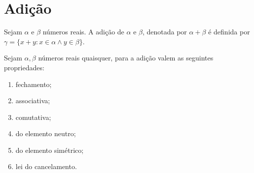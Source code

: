 \documentclass[../main.tex]{subfiles}
\begin{document}
\section{Adição}
\begin{defi}
    Sejam $\alpha$ e $\beta$ números reais. A adição de $\alpha$ e $\beta$, denotada por $\alpha + \beta$ é definida por $\gamma = \{ x + y : x \in \alpha \land y \in \beta \}$.
\end{defi}
\begin{prop}\label{reais-prop-prop}{Sejam $\alpha, \beta$ números reais quaisquer, para a adição valem as seguintes propriedades:}
    \begin{enumerate}[label=(\roman*)]
        \item fechamento;
        \item associativa;
        \item comutativa;
        \item do elemento neutro; 
        \item do elemento simétrico;
        \item lei do cancelamento.
    \end{enumerate}
\end{prop}
\end{document}
